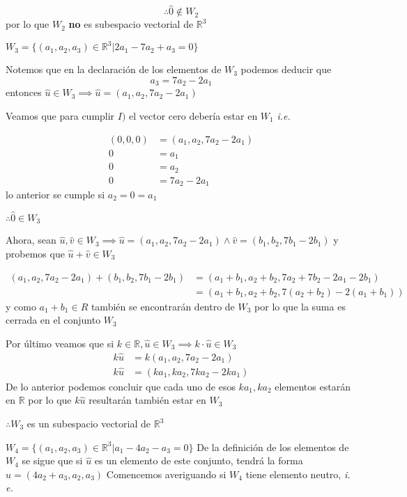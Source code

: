 \documentclass[letterpaper]{article}
\newcommand{\R}{\mathds{R}}
\renewcommand{\*}{\cdot}
\theoremstyle{definition}
\begin{document}
\begin{tasks}
\[ \therefore \hat{0} \notin W_2  \] por lo que $ W_2 $ \textbf{no} es subespacio vectorial de $ \R^3 $


\task $W_{3} = \lbrace (a_{1},a_{2},a_{3}) \in \mathbb{R}^{3} \big\vert  2a_{1} - 7a_{2} + a_{3} = 0 \rbrace$

Notemos que en la declaración de los elementos de $ W_3 $ podemos deducir que \[ a_3 = 7a_2 - 2 a_1 \] entonces $ \hat{u} \in W_3 \implies \hat{u} = (a_1, a_2, 7a_2 - 2a_1)  $

Veamos que para cumplir $ I) $ el vector cero debería estar en $ W_1 $ \textit{i.e.} 

\begin{align*}
	(0,0,0) &= (a_1, a_2, 7a_2 - 2 a_1) \\
	0 &=  a_1\\
	0 &=  a_2\\
	0 &=  7a_2 -2 a_1
\end{align*}
 lo anterior se cumple si $ a_2 = 0 = a_1 $
 
 $ \therefore \hat{0} \in W_3 $
 
 Ahora, sean $ \hat{u}, \hat{v} \in W_3 \implies \hat{u} = (a_1, a_2, 7a_2 - 2a_1) \land \hat{v} = (b_1, b_2, 7b_1 - 2 b_1) $ y probemos que $ \hat{u} + \hat{v} \in W_3 $
 
 \begin{align*}
 	(a_1, a_2, 7a_2 - 2a_1) + (b_1, b_2, 7b_1 - 2 b_1) &= (a_1 + b_1, a_2 + b _2, 7a_2 + 7b_2 -2a_1 - 2b_1)\\
 	&= (a_1 + b_1, a_2 + b _2, 7(a_2 + b_2) -2(a_1 +b_1))
 \end{align*}
 y como $ a_1 + b_1 \in R $ también se encontrarán dentro de $ W_3 $ por lo que la suma es cerrada en el conjunto $ W_3 $
 
 Por último veamos que si $ k \in \R, \hat{u} \in W_3 \implies k\* \hat{u} \in W_3 $
	\begin{align*}
		k\hat{u} &= k(a_1, a_2, 7a_2 - 2a_1)\\
		k\hat{u} &= (ka_1, ka_2, 7ka_2 - 2ka_1)
	\end{align*}
	De lo anterior podemos concluir que cada uno de esos $ ka_1, ka_2 $  elementos estarán en $ \R  $ por lo que $ k\hat{u} $ resultarán también estar en $ W_3 $
	
	$ \therefore W_3$ es un subespacio vectorial de $ \R^3 $

\task $W_{4} = \lbrace (a_{1},a_{2},a_{3}) \in \mathbb{R}^{3} \big\vert  a_{1} - 4a_{2} - a_{3} = 0 \rbrace$
De la definición de los elementos de $ W_4 $ se sigue que si $ \hat{u} $ es un elemento de este conjunto, tendrá la forma $ \hat{u}= (4a_2 + a_3, a_2, a_3) $
Comencemos averiguando si $ W_4 $ tiene elemento neutro, \textit{i. e.}


\end{tasks}
\end{document}
